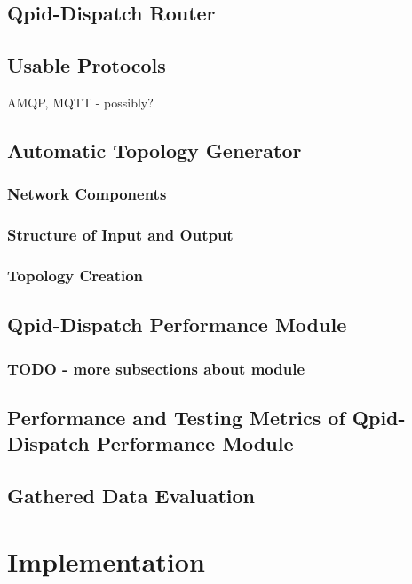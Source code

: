 \section{Qpid-Dispatch Router}

\section{Usable Protocols}
AMQP, MQTT - possibly?

\section{Automatic Topology Generator}

\subsection{Network Components}

\subsection{Structure of Input and Output}

\subsection{Topology Creation}

\section{Qpid-Dispatch Performance Module}

\subsection{TODO - more subsections about module}

\section{Performance and Testing Metrics of Qpid-Dispatch Performance Module}

\section{Gathered Data Evaluation}

\chapter{Implementation}
\label{Implementation}

